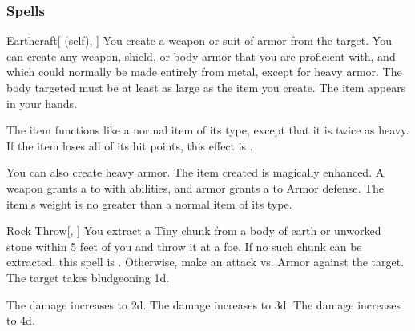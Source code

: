 \subsubsection{Spells}


\lowercase{\hypertarget{spell:Earthcraft}{}}\label{spell:Earthcraft}
\begin{attuneability}[Rank 1]{\hypertarget{spell:Earthcraft}{Earthcraft}}[ (self), ]
You create a weapon or suit of armor from the target.
You can create any weapon, shield, or body armor that you are proficient with, and which could normally be made entirely from metal, except for heavy armor.
The body targeted must be at least as large as the item you create.
The item appears in your hands.

The item functions like a normal item of its type, except that it is twice as heavy.
If the item loses all of its hit points, this effect is .

\rankline
{} You can also create heavy armor.
 The item created is magically enhanced.
A weapon grants a   to  with  abilities,
and armor grants a   to Armor defense.
 The item's weight is no greater than a normal item of its type.
\end{attuneability}
\vspace{0.25em}



\lowercase{\hypertarget{spell:Rock Throw}{}}\label{spell:Rock Throw}
\begin{freeability}[Rank 1]{\hypertarget{spell:Rock Throw}{Rock Throw}}[, ]
You extract a Tiny chunk from a body of earth or unworked stone within 5 feet of you and throw it at a foe.
If no such chunk can be extracted, this spell is .
Otherwise, make an attack vs. Armor against the target.
\hit The target takes bludgeoning  \plus1d.

\rankline
{} The damage increases to  \plus2d.
 The damage increases to  \plus3d.
 The damage increases to  \plus4d.
\end{freeability}
\vspace{0.25em}



